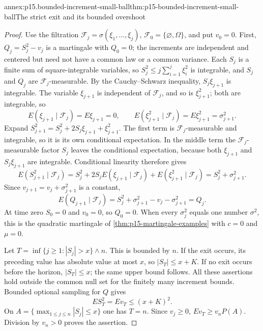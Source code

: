 \begin{annexitem}{annex:p15.bounded-increment-small-ball}{thm:p15-bounded-increment-small-ball}{The strict exit and its bounded overshoot}
\begin{proof}
Use the filtration \(\mathcal F_j=\sigma(\xi_1,\ldots,\xi_j)\),
\(\mathcal F_0=\{\varnothing,\Omega\}\), and put \(v_0=0\).
First, \(Q_j=S_j^2-v_j\) is a martingale with \(Q_0=0\); the
increments are independent and centered but need not have a common law
or a common variance.
Each \(S_j\) is a finite sum of square-integrable variables, so
\(S_j^2\leq j\sum_{i=1}^j\xi_i^2\) is integrable, and \(S_j\) and
\(Q_j\) are \(\mathcal F_j\)-measurable. By the Cauchy--Schwarz
inequality, \(S_j\xi_{j+1}\) is integrable.
The variable \(\xi_{j+1}\) is independent of \(\mathcal F_j\), and so
is \(\xi_{j+1}^2\); both are integrable, so
\[
 E(\xi_{j+1}\mid\mathcal F_j)=E\xi_{j+1}=0,\qquad
 E(\xi_{j+1}^2\mid\mathcal F_j)=E\xi_{j+1}^2=\sigma_{j+1}^2 .
\]
Expand \(S_{j+1}^2=S_j^2+2S_j\xi_{j+1}+\xi_{j+1}^2\).
The first term is \(\mathcal F_j\)-measurable and integrable, so it is
its own conditional expectation. In the middle term the
\(\mathcal F_j\)-measurable factor \(S_j\) leaves the conditional
expectation, because both \(\xi_{j+1}\) and \(S_j\xi_{j+1}\) are
integrable. Conditional linearity therefore gives
\[
 E(S_{j+1}^2\mid\mathcal F_j)
   =S_j^2+2S_jE(\xi_{j+1}\mid\mathcal F_j)
          +E(\xi_{j+1}^2\mid\mathcal F_j)
   =S_j^2+\sigma_{j+1}^2 .
\]
Since \(v_{j+1}=v_j+\sigma_{j+1}^2\) is a constant,
\[
 E(Q_{j+1}\mid\mathcal F_j)
   =S_j^2+\sigma_{j+1}^2-v_j-\sigma_{j+1}^2=Q_j .
\]
At time zero \(S_0=0\) and \(v_0=0\), so \(Q_0=0\).
When every \(\sigma_j^2\) equals one number \(\sigma^2\), this is the
quadratic martingale of \cref{thm:p15-martingale-examples} with
\(c=0\) and \(\mu=0\).

Let \(T=\inf\{j\geq1:|S_j|>x\}\wedge n\).
This is bounded by \(n\). If the exit occurs, its preceding
value has absolute value at most \(x\), so \(|S_T|\leq x+K\).
If no exit occurs before the horizon, \(|S_T|\leq x\);
the same upper bound follows.
All these assertions hold outside the common null set for
the finitely many increment bounds.
Bounded optional sampling for \(Q\) gives
\[
                              ES_T^2=Ev_T\leq(x+K)^2.
\]
On \(A=\{\max_{1\leq j\leq n}|S_j|\leq x\}\) one has \(T=n\).
Since \(v_j\geq0\), \(Ev_T\geq v_nP(A)\).
Division by \(v_n>0\) proves the assertion.
\end{proof}
\end{annexitem}

